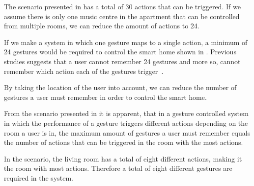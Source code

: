 The scenario presented in  has a total of 30 actions that can be triggered. If we assume there is only one music centre in the apartment that can be controlled from multiple rooms, we can reduce the amount of actions to 24.

If we make a system in which one gesture maps to a single action, a minimum of 24 gestures would be required to control the smart home shown in . Previous studies suggests that a user cannot remember 24 gestures and more so, cannot remember which action each of the gestures trigger~\cite{Kela2006,miller1956magical}.

By taking the location of the user into account, we can reduce the number of gestures a user must remember in order to control the smart home.

From the scenario presented in  it is apparent, that in a gesture controlled system in which the performance of a gesture triggers different actions depending on the room a user is in, the maximum amount of gestures a user must remember equals the number of actions that can be triggered in the room with the most actions.

In the scenario, the living room has a total of eight different actions, making it the room with most actions. Therefore a total of eight different gestures are required in the system.

